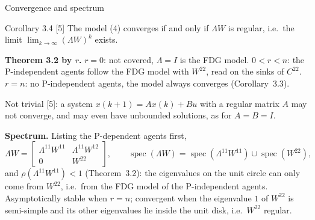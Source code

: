 \begin{frame}[label=bk-fj-stab2]{Convergence and spectrum}
  \footnotesize
  \begin{block}{Corollary 3.4 [5]}
    The model (4) converges if and only if $\Lambda W$ is regular, i.e.\ the limit
    $\lim_{k \to \infty} (\Lambda W)^k$ exists.
  \end{block}
  \textbf{Theorem 3.2 by $r$.} $r = 0$: not covered, $\Lambda = I$ is the FDG model.
  $0 < r < n$: the P-independent agents follow the FDG model with $W^{22}$, read on the
  sinks of $C^{22}$. $r = n$: no P-independent agents, the model always converges
  (Corollary~3.3).

  \medskip
  Not trivial [5]: a system $x(k+1) = A x(k) + B u$ with a regular matrix $A$ may not
  converge, and may even have unbounded solutions, as for $A = B = I$.

  \medskip
  \textbf{Spectrum.} Listing the P-dependent agents first,
  \[
    \Lambda W = \begin{bmatrix} \Lambda^{11} W^{11} & \Lambda^{11} W^{12} \\ 0 & W^{22}
    \end{bmatrix},
    \qquad
    \operatorname{spec}(\Lambda W) = \operatorname{spec}(\Lambda^{11} W^{11}) \cup
    \operatorname{spec}(W^{22}),
  \]
  and $\rho(\Lambda^{11} W^{11}) < 1$ (Theorem~3.2): the eigenvalues on the unit circle
  can only come from $W^{22}$, i.e.\ from the FDG model of the P-independent agents.
  Asymptotically stable when $r = n$; convergent when the eigenvalue $1$ of $W^{22}$ is
  semi-simple and its other eigenvalues lie inside the unit disk, i.e.\ $W^{22}$ regular.
\end{frame}

